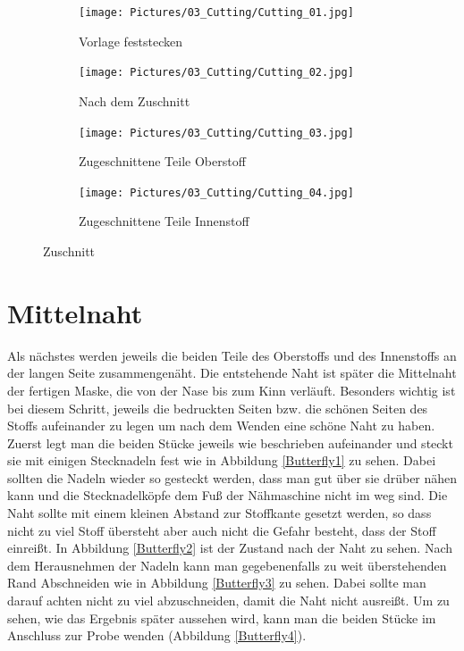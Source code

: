 \documentclass[12pt,parskip=full]{scrartcl}
\begin{document}
\begin{figure}[ht]
    \vspace{0.5cm}
    \centering
    \begin{subfigure}{0.48\textwidth}
        \centering
        \texttt{[image: Pictures/03\_Cutting/Cutting\_01.jpg]}
        \caption{Vorlage feststecken}
        \label{Cutting1}
    \end{subfigure}
    \begin{subfigure}{0.48\textwidth}
        \centering
        \texttt{[image: Pictures/03\_Cutting/Cutting\_02.jpg]}
        \caption{Nach dem Zuschnitt}
        \label{Cutting2}
    \end{subfigure}
    \begin{subfigure}{0.48\textwidth}
        \centering
        \texttt{[image: Pictures/03\_Cutting/Cutting\_03.jpg]}
        \caption{Zugeschnittene Teile Oberstoff}
        \label{Cutting3}
    \end{subfigure}
    \begin{subfigure}{0.48\textwidth}
        \centering
        \texttt{[image: Pictures/03\_Cutting/Cutting\_04.jpg]}
        \caption{Zugeschnittene Teile Innenstoff}
        \label{Cutting4}
    \end{subfigure}
    \caption{Zuschnitt}
    \label{Cutting}
\end{figure}

\section{Mittelnaht}
Als nächstes werden jeweils die beiden Teile des Oberstoffs und des Innenstoffs an der langen Seite zusammengenäht. Die entstehende Naht ist später die Mittelnaht der fertigen Maske, die von der Nase bis zum Kinn verläuft. Besonders wichtig ist bei diesem Schritt, jeweils die bedruckten Seiten bzw. die schönen Seiten des Stoffs aufeinander zu legen um nach dem Wenden eine schöne Naht zu haben. Zuerst legt man die beiden Stücke jeweils wie beschrieben aufeinander und steckt sie mit einigen Stecknadeln fest wie in Abbildung \ref{Butterfly1} zu sehen. Dabei sollten die Nadeln wieder so gesteckt werden, dass man gut über sie drüber nähen kann und die Stecknadelköpfe dem Fuß der Nähmaschine nicht im weg sind. Die Naht sollte mit einem kleinen Abstand zur Stoffkante gesetzt werden, so dass nicht zu viel Stoff übersteht aber auch nicht die Gefahr besteht, dass der Stoff einreißt. In Abbildung \ref{Butterfly2} ist der Zustand nach der Naht zu sehen. Nach dem Herausnehmen der Nadeln kann man gegebenenfalls zu weit überstehenden Rand Abschneiden wie in Abbildung \ref{Butterfly3} zu sehen. Dabei sollte man darauf achten nicht zu viel abzuschneiden, damit die Naht nicht ausreißt. Um zu sehen, wie das Ergebnis später aussehen wird, kann man die beiden Stücke im Anschluss zur Probe wenden (Abbildung \ref{Butterfly4}).
\end{document}
